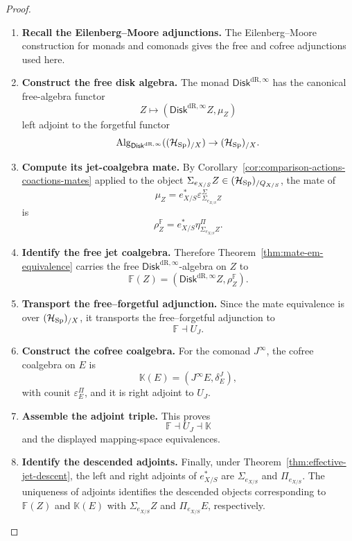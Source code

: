 \begin{proof}
\leavevmode
\begin{enumerate}[label=\textup{(\arabic*)}]
    \item \textbf{Recall the Eilenberg--Moore adjunctions.}
The Eilenberg--Moore construction for monads and comonads
\cite{LurieHigherAlgebra} gives the free and cofree adjunctions used here.

    \item \textbf{Construct the free disk algebra.}
The monad \(\mathsf{Disk}^{\mathrm{dR},\infty}\) has the canonical free-algebra functor
\[
  Z\longmapsto(\mathsf{Disk}^{\mathrm{dR},\infty} Z,\mu_Z)
\]
left adjoint to the forgetful functor
\[
  \operatorname{Alg}_{\mathsf{Disk}^{\mathrm{dR},\infty}}((\mathcal H_{\operatorname{Sp}})_{/X})\to(\mathcal H_{\operatorname{Sp}})_{/X}.
\]

    \item \textbf{Compute its jet-coalgebra mate.}
By Corollary~\ref{cor:comparison-actions-coactions-mates} applied to the object
\(\Sigma_{e_{X/S}} Z\in(\mathcal H_{\operatorname{Sp}})_{/Q_{X/S}}\), the mate of
\[
  \mu_Z
  =
  e_{X/S}^*\varepsilon^\Sigma_{\Sigma_{e_{X/S}} Z}
\]
is
\[
  \rho_Z^{\mathbb F}
  =
  e_{X/S}^*\eta^\Pi_{\Sigma_{e_{X/S}} Z}.
\]

    \item \textbf{Identify the free jet coalgebra.}
Therefore Theorem~\ref{thm:mate-em-equivalence} carries the free
\(\mathsf{Disk}^{\mathrm{dR},\infty}\)-algebra on \(Z\) to
\[
  \mathbb F(Z)=(\mathsf{Disk}^{\mathrm{dR},\infty} Z,\rho_Z^{\mathbb F}).
\]

    \item \textbf{Transport the free--forgetful adjunction.}
Since the mate equivalence is over \((\mathcal H_{\operatorname{Sp}})_{/X}\), it transports the
free--forgetful adjunction to
\[
  \mathbb F\dashv U_J.
\]

    \item \textbf{Construct the cofree coalgebra.}
For the comonad \(J^\infty\), the cofree coalgebra on \(E\) is
\[
  \mathbb K(E)=(J^\infty E,\delta^J_E),
\]
with counit \(\varepsilon^\Pi_E\), and it is right adjoint to \(U_J\).

    \item \textbf{Assemble the adjoint triple.}
This proves
\[
  \mathbb F\dashv U_J\dashv\mathbb K
\]
and the displayed mapping-space equivalences.

    \item \textbf{Identify the descended adjoints.}
Finally, under
Theorem~\ref{thm:effective-jet-descent}, the left and right adjoints of
\(e_{X/S}^*\) are \(\Sigma_{e_{X/S}}\) and \(\Pi_{e_{X/S}}\). The uniqueness
of adjoints identifies the descended objects corresponding to
\(\mathbb F(Z)\) and \(\mathbb K(E)\) with
\(\Sigma_{e_{X/S}} Z\) and \(\Pi_{e_{X/S}} E\), respectively.
\end{enumerate}
\end{proof}

